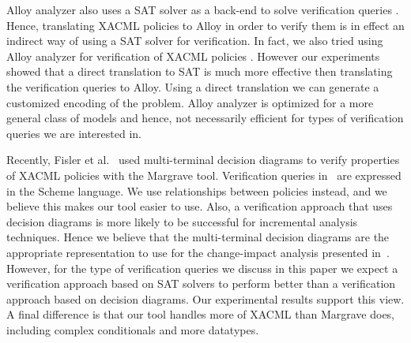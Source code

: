 Alloy analyzer also uses a SAT solver as a back-end to solve
verification queries \cite{jackson00automating,jackson:alcoa}.  Hence,
translating XACML policies to Alloy in order to verify them is in
effect an indirect way of using a SAT solver for verification.  In
fact, we also tried using Alloy analyzer for verification of XACML
policies \cite{hughes04}.  However our experiments showed that a
direct translation to SAT is much more effective then translating the
verification queries to Alloy.  Using a direct translation we can
generate a customized encoding of the problem. Alloy analyzer is
optimized for a more general class of models and hence, not
necessarily efficient for types of verification queries we are
interested in.

Recently, Fisler et al.~\cite{fisler05} used multi-terminal decision
diagrams to verify properties of XACML policies with the Margrave
tool.  Verification queries in~\cite{fisler05} are expressed in the
Scheme language.  We use relationships between policies instead, and
we believe this makes our tool easier to use.  Also, a verification
approach that uses decision diagrams is more likely to be successful
for incremental analysis techniques.  Hence we believe that the
multi-terminal decision diagrams are the appropriate representation to
use for the change-impact analysis presented in~\cite{fisler05}.
However, for the type of verification queries we discuss in this paper
we expect a verification approach based on SAT solvers to perform
better than a verification approach based on decision diagrams.  Our
experimental results support this view.  A final difference is that
our tool handles more of XACML than Margrave does, including complex
conditionals and more datatypes.
